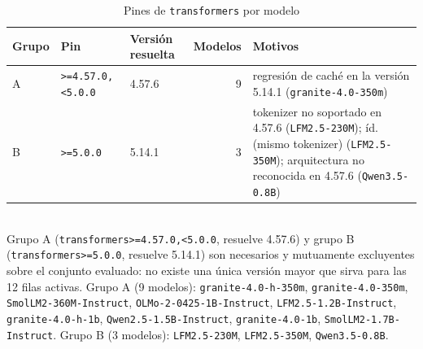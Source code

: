 \begin{table}[htbp]
\centering
\caption{Pines de \texttt{transformers} por modelo}
\label{tab:versiones}
{\footnotesize
\begin{tabular}{lllr>{\raggedright\arraybackslash}p{4.8cm}}
\toprule
Grupo & Pin & Versión resuelta & Modelos & Motivos \\
\midrule
A & \texttt{>=4.57.0,<5.0.0} & 4.57.6 & 9 & regresión de caché en la versión 5.14.1 (\texttt{granite-4.0-350m}) \\
B & \texttt{>=5.0.0} & 5.14.1 & 3 & tokenizer no soportado en 4.57.6 (\texttt{LFM2.5-230M}); íd. (mismo tokenizer) (\texttt{LFM2.5-350M}); arquitectura no reconocida en 4.57.6 (\texttt{Qwen3.5-0.8B}) \\
\bottomrule
\end{tabular}
}
\\[2pt]\footnotesize{Grupo A (\texttt{transformers>=4.57.0,<5.0.0}, resuelve 4.57.6) y grupo B (\texttt{transformers>=5.0.0}, resuelve 5.14.1) son necesarios y mutuamente excluyentes sobre el conjunto evaluado: no existe una única versión mayor que sirva para las 12 filas activas. Grupo A (9 modelos): \texttt{granite-4.0-h-350m}, \texttt{granite-4.0-350m}, \texttt{SmolLM2-360M-Instruct}, \texttt{OLMo-2-0425-1B-Instruct}, \texttt{LFM2.5-1.2B-Instruct}, \texttt{granite-4.0-h-1b}, \texttt{Qwen2.5-1.5B-Instruct}, \texttt{granite-4.0-1b}, \texttt{SmolLM2-1.7B-Instruct}. Grupo B (3 modelos): \texttt{LFM2.5-230M}, \texttt{LFM2.5-350M}, \texttt{Qwen3.5-0.8B}.}
\end{table}
